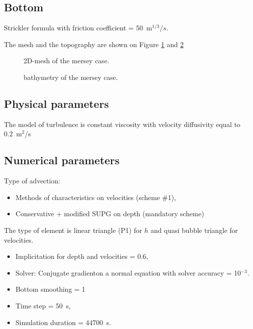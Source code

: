\subsection{Bottom}
Strickler formula with friction coefficient = 50~m$^{1/3}/s$.

The mesh and the topography are shown on Figure \ref{fig:mersey:Mesh} and \ref{fig:mersey:Bathy}

\begin{figure}[H]
 \centering
  \caption{2D-mesh of the mersey case.}\label{fig:mersey:Mesh}
\end{figure}


\begin{figure}[H]
 \centering
  \caption{bathymetry of the mersey case.}\label{fig:mersey:Bathy}
\end{figure}

\subsection{Physical parameters}
The model of turbulence is constant viscosity
with velocity diffusivity  equal to 0.2~m$^2$/s

\subsection{Numerical parameters}
Type of advection:
\begin{itemize}
\item Methods of characteristics on velocities (scheme \#1),
\item Conservative + modified SUPG on depth (mandatory scheme)
\end{itemize}
The type of element is linear triangle (P1) for $h$ and quasi bubble triangle
for velocities.
\begin{itemize}
\item Implicitation for depth and velocities = 0.6,
\item Solver: Conjugate gradienton a normal equation with solver accuracy = 10$^{-3}$.
\item Bottom smoothing = 1
\item Time step = 50~s,
\item Simulation duration = 44700~s.
\end{itemize}

